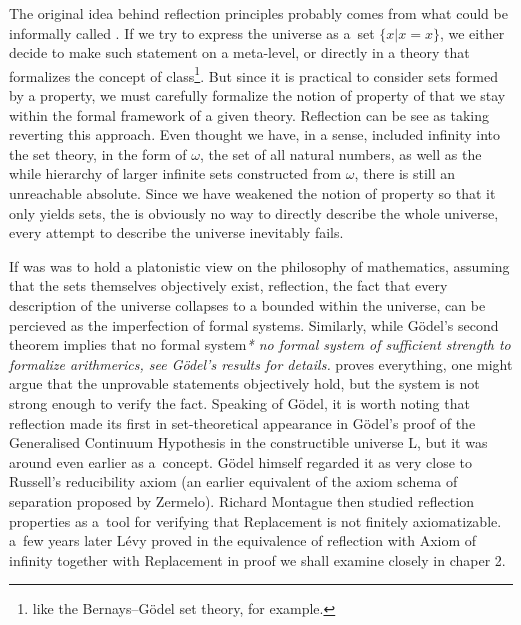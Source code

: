 The original idea behind reflection principles probably comes from what could be informally called .
If we try to express the universe as a~set $\{x  |  x = x\}$, we either decide to make such statement on a meta-level, or directly in a theory that formalizes the concept of class\footnote{like the Bernays–Gödel set theory, for example.}. But since it is practical to consider sets formed by a property, we must carefully formalize the notion of property of that we stay within the formal framework of a given theory. Reflection can be see as taking reverting this approach. Even thought we have, in a sense, included infinity into the set theory, in the form of $\omega$, the set of all natural numbers, as well as the while hierarchy of larger infinite sets constructed from $\omega$, there is still an unreachable absolute. Since we have weakened the notion of property so that it only yields sets, the is obviously no way to directly describe the whole universe, every attempt to describe the universe inevitably fails.

If was was to hold a platonistic view on the philosophy of mathematics, assuming that the sets themselves objectively exist, reflection, the fact that every description of the universe collapses to a bounded within the universe, can be percieved as the imperfection of formal systems. Similarly, while Gödel's second theorem implies that no formal system\emph{* no formal system of sufficient strength to formalize arithmerics, see Gödel's results for details.} proves everything, one might argue that the unprovable statements objectively hold, but the system is not strong enough to verify the fact. Speaking of Gödel, it is worth noting that reflection made its first in set-theoretical appearance in G{\"o}del's proof of the Generalised Continuum Hypothesis in the constructible universe L, but it was around even earlier as a~concept. G{\"o}del himself regarded it as very close to Russell's reducibility axiom (an earlier equivalent of the axiom schema of separation proposed by Zermelo). Richard Montague then studied reflection properties as a~tool for verifying that Replacement is not finitely axiomatizable. a~few years later Lévy proved in \cite{Levy60a} the equivalence of reflection with Axiom of infinity together with Replacement in proof we shall examine closely in chaper 2.


